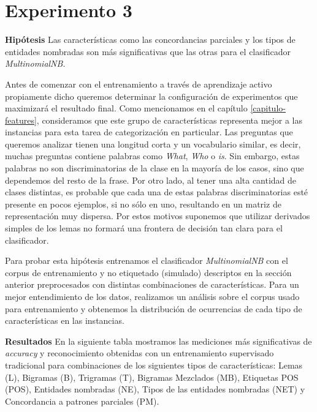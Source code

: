 \section{Experimento 3}
\vspace{3 mm}
\textbf{Hipótesis} Las características como las concordancias parciales y los tipos de entidades nombradas son más significativas que las otras para el clasificador \textit{MultinomialNB}.
\vspace{3 mm}

Antes de comenzar con el entrenamiento a través de aprendizaje activo propiamente dicho queremos determinar la configuración de experimentos que maximizará el resultado final. Como mencionamos en el capítulo \ref{capitulo-features}, consideramos que este grupo de características representa mejor a las instancias para esta tarea de categorización en particular. Las preguntas que queremos analizar tienen una longitud corta y un vocabulario similar, es decir, muchas preguntas contiene palabras como \textit{What}, \textit{Who} o \textit{is}. Sin embargo, estas palabras no son discriminatorias de la clase en la mayoría de los casos, sino que dependemos del resto de la frase. Por otro lado, al tener una alta cantidad de clases distintas, es probable que cada una de estas palabras discriminatorias esté presente en pocos ejemplos, si no sólo en uno, resultando en un matriz de representación muy dispersa. Por estos motivos suponemos que utilizar derivados simples de los lemas no formará una frontera de decisión tan clara para el clasificador.

Para probar esta hipótesis entrenamos el clasificador \textit{MultinomialNB} con el corpus de entrenamiento y no etiquetado (simulado) descriptos en la sección anterior preprocesados con distintas combinaciones de características. Para un mejor entendimiento de los datos, realizamos un análisis sobre el corpus usado para entrenamiento y obtenemos la distribución de ocurrencias de cada tipo de características en las instancias.

\vspace{3 mm}

\textbf{Resultados} En la siguiente tabla mostramos las mediciones más significativas de \textit{accuracy} y reconocimiento obtenidas con un entrenamiento supervisado tradicional para combinaciones de los siguientes tipos de características: Lemas (L), Bigramas (B), Trigramas (T), Bigramas Mezclados (MB), Etiquetas POS (POS), Entidades nombradas (NE), Tipos de las entidades nombradas (NET) y Concordancia a patrones parciales (PM).

